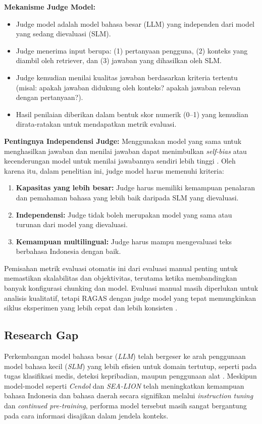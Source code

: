 \textbf{Mekanisme Judge Model:}
\begin{itemize}
    \item Judge model adalah model bahasa besar (LLM) yang independen dari model yang sedang dievaluasi (SLM).
    \item Judge menerima input berupa: (1) pertanyaan pengguna, (2) konteks yang diambil oleh retriever, dan (3) jawaban yang dihasilkan oleh SLM.
    \item Judge kemudian menilai kualitas jawaban berdasarkan kriteria tertentu (misal: apakah jawaban didukung oleh konteks? apakah jawaban relevan dengan pertanyaan?).
    \item Hasil penilaian diberikan dalam bentuk skor numerik (0--1) yang kemudian dirata-ratakan untuk mendapatkan metrik evaluasi.
\end{itemize}

\textbf{Pentingnya Independensi Judge:}
Menggunakan model yang sama untuk menghasilkan jawaban dan menilai jawaban dapat menimbulkan \textit{self-bias} atau kecenderungan model untuk menilai jawabannya sendiri lebih tinggi \citep{zheng2023judging}. Oleh karena itu, dalam penelitian ini, judge model harus memenuhi kriteria:
\begin{enumerate}
    \item \textbf{Kapasitas yang lebih besar:} Judge harus memiliki kemampuan penalaran dan pemahaman bahasa yang lebih baik daripada SLM yang dievaluasi.
    \item \textbf{Independensi:} Judge tidak boleh merupakan model yang sama atau turunan dari model yang dievaluasi.
    \item \textbf{Kemampuan multilingual:} Judge harus mampu mengevaluasi teks berbahasa Indonesia dengan baik.
\end{enumerate}

Pemisahan metrik evaluasi otomatis ini dari evaluasi manual penting untuk memastikan skalabilitas dan objektivitas, terutama ketika membandingkan banyak konfigurasi chunking dan model. Evaluasi manual masih diperlukan untuk analisis kualitatif, tetapi RAGAS dengan judge model yang tepat memungkinkan siklus eksperimen yang lebih cepat dan lebih konsisten \citep{es2025ragasautomatedevaluationretrieval}.

\subsection{Research Gap}

Perkembangan model bahasa besar (\textit{LLM}) telah bergeser ke arah penggunaan model bahasa kecil (\textit{SLM}) yang lebih efisien untuk domain tertutup, seperti pada tugas klasifikasi medis, deteksi kepribadian, maupun penggunaan alat \citep{shen2024small}. Meskipun model-model seperti \textit{Cendol} \citep{cahyawijaya2024cendol} dan \textit{SEA-LION} \citep{ng2025sealion} telah meningkatkan kemampuan bahasa Indonesia dan bahasa daerah secara signifikan melalui \textit{instruction tuning} dan \textit{continued pre-training}, performa model tersebut masih sangat bergantung pada cara informasi disajikan dalam jendela konteks.

